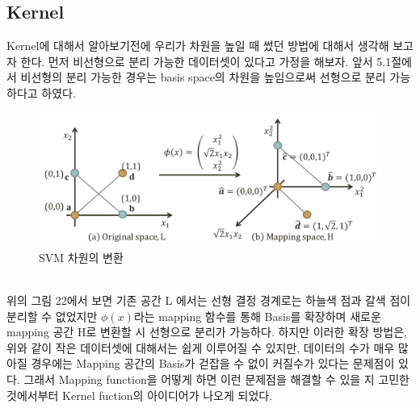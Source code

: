 \documentclass[a4paper]{oblivoir}
\begin{document}
\subsection{Kernel}
\indent Kernel에 대해서 알아보기전에 우리가 차원을 높일 때 썼던 방법에 대해서 생각해 보고자 한다. 먼저 비선형으로 분리 가능한 데이터셋이 있다고 가정을 해보자. 앞서 5.1절에서 비선형의 분리 가능한 경우는 basis space의 차원을 높임으로써 선형으로 분리 가능하다고 하였다.
\begin{figure}[ht]\centering
\includegraphics[scale=0.5]{Mapping}\caption{SVM 차원의 변환}\label{Fig:5-22}
\end{figure}\\
\indent 위의 그림 22에서 보면 기존 공간 L 에서는 선형 결정 경계로는 하늘색 점과 갈색 점이 분리할 수 없었지만 $\phi(x)$라는 mapping 함수를 통해 Basis를 확장하며 새로운 mapping 공간 H로 변환할 시 선형으로 분리가 가능하다. 하지만 이러한 확장 방법은, 위와 같이 작은 데이터셋에 대해서는 쉽게 이루어질 수 있지만, 데이터의 수가 매우 많아질 경우에는 Mapping 공간의 Basis가 걷잡을 수 없이 커질수가 있다는 문제점이 있다. 그래서 Mapping function을 어떻게 하면 이런 문제점을 해결할 수 있을 지 고민한 것에서부터 Kernel fuction의 아이디어가 나오게 되었다.
\end{document}
